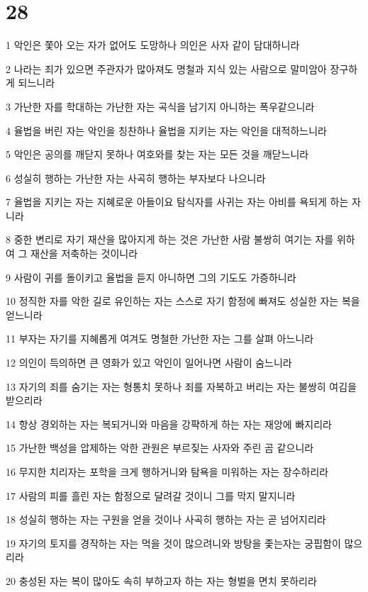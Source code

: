 \chapter{28}

\par 1 악인은 쫓아 오는 자가 없어도 도망하나 의인은 사자 같이 담대하니라
\par 2 나라는 죄가 있으면 주관자가 많아져도 명철과 지식 있는 사람으로 말미암아 장구하게 되느니라
\par 3 가난한 자를 학대하는 가난한 자는 곡식을 남기지 아니하는 폭우같으니라
\par 4 율법을 버린 자는 악인을 칭찬하나 율법을 지키는 자는 악인을 대적하느니라
\par 5 악인은 공의를 깨닫지 못하나 여호와를 찾는 자는 모든 것을 깨닫느니라
\par 6 성실히 행하는 가난한 자는 사곡히 행하는 부자보다 나으니라
\par 7 율법을 지키는 자는 지혜로운 아들이요 탐식자를 사귀는 자는 아비를 욕되게 하는 자니라
\par 8 중한 변리로 자기 재산을 많아지게 하는 것은 가난한 사람 불쌍히 여기는 자를 위하여 그 재산을 저축하는 것이니라
\par 9 사람이 귀를 돌이키고 율법을 듣지 아니하면 그의 기도도 가증하니라
\par 10 정직한 자를 악한 길로 유인하는 자는 스스로 자기 함정에 빠져도 성실한 자는 복을 얻느니라
\par 11 부자는 자기를 지혜롭게 여겨도 명철한 가난한 자는 그를 살펴 아느니라
\par 12 의인이 득의하면 큰 영화가 있고 악인이 일어나면 사람이 숨느니라
\par 13 자기의 죄를 숨기는 자는 형통치 못하나 죄를 자복하고 버리는 자는 불쌍히 여김을 받으리라
\par 14 항상 경외하는 자는 복되거니와 마음을 강퍅하게 하는 자는 재앙에 빠지리라
\par 15 가난한 백성을 압제하는 악한 관원은 부르짖는 사자와 주린 곰 같으니라
\par 16 무지한 치리자는 포학을 크게 행하거니와 탐욕을 미워하는 자는 장수하리라
\par 17 사람의 피를 흘린 자는 함정으로 달려갈 것이니 그를 막지 말지니라
\par 18 성실히 행하는 자는 구원을 얻을 것이나 사곡히 행하는 자는 곧 넘어지리라
\par 19 자기의 토지를 경작하는 자는 먹을 것이 많으려니와 방탕을 좇는자는 궁핍함이 많으리라
\par 20 충성된 자는 복이 많아도 속히 부하고자 하는 자는 형벌을 면치 못하리라
